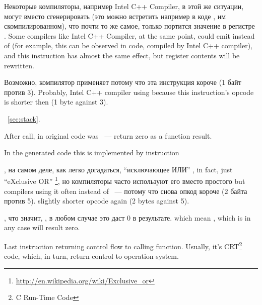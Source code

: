 \IFRU
{Некоторые компиляторы, например Intel C++ Compiler, в этой же ситуации, могут вместо 
\ADD сгенерировать  (это можно встретить например в коде \oracle{}, им скомпилированном), 
что почти то же самое, только портится значение в регистре \ECX.}
{Some compilers like Intel C++ Compiler, at the same point, could emit  
instead of \ADD (for example, this can be observed in \oracle{} code, compiled by Intel C++ compiler), 
and this instruction has almost the same effect, but \ECX register contents will be rewritten.}

\IFRU
{Возможно, компилятор применяет  потому что эта инструкция короче (1 байт против 3).}
{Probably, Intel C++ compiler using  because this instruction's opcode is shorter then 
 (1 byte against 3).}

~\ref{sec:stack}.

{After \printf call, in original \CCpp code was  ~--- return zero as a \main function result.} 

{In the generated code this is implemented by instruction}  

\IFRU
{\XOR, на самом деле, как легко догадаться, ``исключающее ИЛИ''}
{\XOR, in fact, just ``eXclusive OR''}
\footnote{\url{http://en.wikipedia.org/wiki/Exclusive_or}}, 
\IFRU
{но компиляторы часто используют его вместо простого}
{but compilers using it often instead of}
 ~--- 
\IFRU
{потому что снова опкод короче (2 байта против 5).}
{slightly shorter opcode again (2 bytes against 5).}

, 
\IFRU
{что значит, , в любом случае это даст 0 в результате.}
{which mean , which is in any case will result zero.}

{Last instruction \RET returning control flow to calling function.
Usually, it's \CCpp CRT\footnote{C Run-Time Code} code, which, in turn, 
return control to operation system.}

